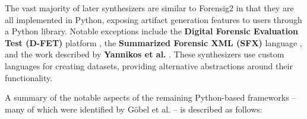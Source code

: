 \documentclass[preprint,12pt]{elsarticle}
\begin{document}
The vast majority of later synthesizers are similar to Forensig2 in that
they are all implemented in Python, exposing artifact generation
features to users through a Python library. Notable exceptions include
the \textbf{Digital Forensic Evaluation Test (D-FET)} platform
\citep{buchananCloudbasedDigitalForensics2010}, the
\textbf{Summarized Forensic XML (SFX)} language
\citep{russellForensicImageDescription2012}, and the work described
by \textbf{Yannikos et al.} \citep{yannikosDataCorporaDigital2014}.
These synthesizers use custom languages for creating datasets, providing
alternative abstractions around their functionality.

A summary of the notable aspects of the remaining Python-based
frameworks -- many of which were identified by Göbel et al.
\citep{gobelForTraceHolisticForensic2022} -- is described as follows:
\end{document}
